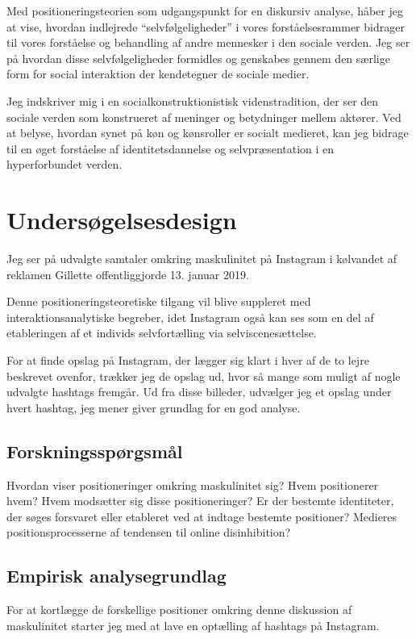 Med positioneringsteorien som udgangspunkt for en diskursiv 
analyse, håber jeg at vise, hvordan indlejrede “selvfølgeligheder” 
i vores forståelsesrammer bidrager til vores forståelse og 
behandling af andre mennesker i den sociale verden. Jeg ser på 
hvordan disse selvfølgeligheder formidles og genskabes gennem den 
særlige form for social interaktion der kendetegner de sociale 
medier.

Jeg indskriver mig i en socialkonstruktionistisk videnstradition, 
der ser den sociale verden som konstrueret af meninger og 
betydninger mellem aktører. Ved at belyse, hvordan synet på køn og 
kønsroller er socialt medieret, kan jeg bidrage til en øget 
forståelse af identitetsdannelse og selvpræsentation i en 
hyperforbundet verden.

\section{Undersøgelsesdesign}

Jeg ser på udvalgte samtaler omkring maskulinitet på Instagram i
kølvandet af reklamen Gillette offentliggjorde 13. januar 2019.  

Denne positioneringsteoretiske tilgang vil blive suppleret med
interaktionsanalytiske begreber, idet Instagram også kan ses som 
en del af etableringen af et individs selvfortælling via 
selviscenesættelse. 

For at finde opslag på Instagram, der lægger sig klart i hver af 
de to lejre beskrevet ovenfor, trækker jeg de opslag ud, hvor så 
mange som muligt af nogle udvalgte hashtags fremgår. Ud fra disse 
billeder, udvælger jeg et opslag under hvert hashtag, jeg mener 
giver grundlag for en god analyse.

\subsection{Forskningsspørgsmål}

Hvordan viser positioneringer
omkring maskulinitet sig? Hvem positionerer hvem? Hvem modsætter
sig disse positioneringer? Er der bestemte identiteter, der søges
forsvaret eller etableret ved at indtage bestemte positioner?
Medieres positionsprocesserne af tendensen til online
disinhibition?

\subsection{Empirisk analysegrundlag}
%
For at kortlægge de forskellige positioner omkring denne 
diskussion af maskulinitet starter jeg med at lave en optælling af 
hashtags på Instagram.

